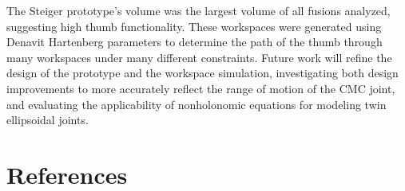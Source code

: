 \documentclass[letterpaper, 10 pt, conference]{ieeeconf}  %
\begin{document}
The Steiger prototype's volume was the largest volume of all fusions analyzed, suggesting high thumb functionality. These workspaces were generated using Denavit Hartenberg parameters to determine the path of the thumb through many workspaces under many different constraints. Future work will refine the design of the prototype and the workspace simulation, investigating both design improvements to more accurately reflect the range of motion of the CMC joint, and evaluating the applicability of nonholonomic equations for modeling twin ellipsoidal joints. 







%



\section{References}


\end{document}
